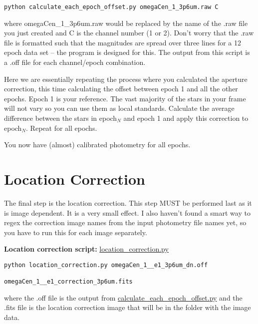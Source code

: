 \documentclass[11pt]{article}
\begin{document}
\begin{verbatim}
python calculate_each_epoch_offset.py omegaCen_1_3p6um.raw C
\end{verbatim}

where omegaCen\_1\_3p6um.raw would be replaced by the name of the .raw file you just created and C is the channel number (1 or 2). Don't worry that the .raw file is formatted such that the magnitudes are spread over three lines for a 12 epoch data set -- the program is designed for this. The output from this script is a .off file for each channel/epoch combination. 

Here we are essentially repeating the process where you calculated the aperture correction, this time calculating the offset between epoch 1 and all the other epochs. Epoch 1 is your reference. The vast majority of the stars in your frame will not vary so you can use them as local standards. Calculate the average difference between the stars in epoch$_{N}$ and epoch 1 and apply this correction to epoch$_{N}$. Repeat for all epochs.

You now have (almost) calibrated photometry for all epochs.

\section{Location Correction}
\label{sec:location}

The final step is the location correction. This step MUST be performed last as it is image dependent. It is a very small effect. I also haven't found a smart way to regex the correction image names from the input photometry file names yet, so you have to run this for each image separately.

{\bf Location correction script:} \href{https://github.com/vickyscowcroft/smhash_code/blob/master/location_correction.py}{location\_correction.py}

\begin{verbatim}
python location_correction.py omegaCen_1__e1_3p6um_dn.off 
                                    omegaCen_1__e1_correction_3p6um.fits 
\end{verbatim}

where the .off file is the output from \href{https://github.com/vickyscowcroft/smhash_code/blob/master/calculate_each_epoch_offset.py}{calculate\_each\_epoch\_offset.py} and the .fits file is the location correction image that will be in the folder with the image data. 
\end{document}

